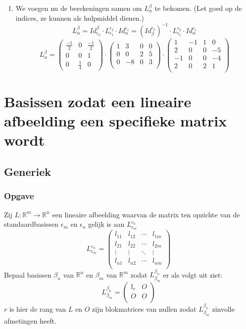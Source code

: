 \documentclass[lineaire_algebra_oplossingen.tex]{subfiles}
\begin{document}
\begin{enumerate}
\item
We voegen nu de berekeningen samen om $L_{\alpha}^{\beta}$ te bekomen. (Let goed op de indices, ze kunnen als hulpmiddel dienen.)
\[
L_{\alpha}^{\beta}
= Id_{\epsilon_2}^{\beta} \cdot L_{\epsilon_1}^{\epsilon_2} \cdot Id_{\alpha}^{\epsilon_1} 
= (Id_{\beta}^{\epsilon_2})^{-1} \cdot L_{\epsilon_1}^{\epsilon_2} \cdot Id_{\alpha}^{\epsilon_1} 
\]
\[
L_{\alpha}^{\beta} = 
\begin{pmatrix}
\frac{-1}{2} & 0 & \frac{-1}{2}\\
0 & 0 & 1\\
0 & \frac{1}{4} & 0
\end{pmatrix}
\cdot
\begin{pmatrix}
1 & 3 & 0 & 0\\
0 & 0 & 2 & 5\\
0 & -8 &0 & 3\\
\end{pmatrix}
\cdot 
\begin{pmatrix}
1 & -1 & 1 & 0\\
2 & 0 & 0 & -5\\
-1 & 0 & 0 & -4\\
2 & 0 & 2 & 1\\
\end{pmatrix}
\]

\end{enumerate}

\section{Basissen zodat een lineaire afbeelding een specifieke matrix wordt}
\label{specifieke_basissen_voor_lineaire_afbeelding}
\subsection*{Generiek}
\subsubsection*{Opgave}
Zij $L: \mathbb{R}^m \rightarrow \mathbb{R}^n$ een lineaire afbeelding waarvan de matrix ten opzichte van de standaardbasissen $\epsilon_m$ en $\epsilon_n$ gelijk is aan $L_{\epsilon_m}^{\epsilon_n}$
\[
L_{\epsilon_m}^{\epsilon_n} =
\begin{pmatrix}
l_{11} & l_{12} & \cdots & l_{1m}\\
l_{21} & l_{22} & \cdots & l_{2m}\\
\vdots & \vdots & \ddots & \vdots\\
l_{n1} & l_{n2} & \cdots & l_{nm}\\
\end{pmatrix}
\]
Bepaal basissen $\beta_n$ van $\mathbb{R}^n$ en $\beta_m$ van $\mathbb{R}^m$ zodat $L_{\beta_m}^{\beta_n}$ er als volgt uit ziet:
\[
L_{\beta_m}^{\beta_n} = 
\begin{pmatrix}
\mathbb{I}_r & O\\
O & O\\
\end{pmatrix}
\]
$r$ is hier de rang van $L$ en $O$ zijn blokmatrices van nullen zodat $L_{\beta_m}^{\beta_n}$ zinvolle afmetingen heeft.
\end{document}
